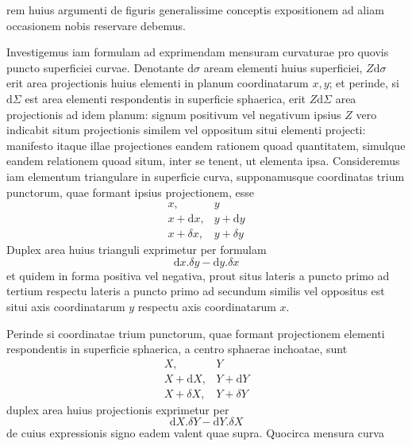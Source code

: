 %
rem huius argumenti de figuris generalissime conceptis expositionem ad aliam occasionem nobis reservare debemus.

Investigemus iam formulam ad exprimendam mensuram curvaturae pro quovis puncto superficiei curvae. Denotante \(\mathrm{d}\sigma\) aream elementi huius superficiei, \(Z\mathrm{d}\sigma\) erit area projectionis huius elementi in planum coordinatarum \(x,y\); et perinde, si \(\mathrm{d}\Sigma\) est area elementi respondentis in superficie sphaerica, erit \(Z\mathrm{d}\Sigma\) area projectionis ad idem planum: signum positivum vel negativum ipsius \(Z\) vero indicabit situm projectionis similem vel oppositum situi elementi projecti: manifesto itaque illae projectiones eandem rationem quoad quantitatem, simulque eandem relationem quoad situm, inter se tenent, ut elementa ipsa. Consideremus iam elementum triangulare in superficie curva, supponamusque coordinatas trium punctorum, quae formant ipsius projectionem, esse
\[
\begin{array}{ll}
x,&y\\
x+\mathrm{d}x,&y+\mathrm{d}y\\
x+\delta x,&y+\delta y
\end{array}
\]
Duplex area huius trianguli exprimetur per formulam
\[
\mathrm{d}x\mathord{.}\delta y-\mathrm{d}y\mathord{.}\delta x
\]
et quidem in forma positiva vel negativa, prout situs lateris a puncto primo ad tertium respectu lateris a puncto primo ad secundum similis vel oppositus est situi axis coordinatarum \(y\) respectu axis coordinatarum \(x\).

Perinde si coordinatae trium punctorum, quae formant projectionem elementi respondentis in superficie sphaerica, a centro sphaerae inchoatae, sunt
\[
\begin{array}{ll}
X,&Y\\
X+\mathrm{d}X,&Y+\mathrm{d}Y\\
X+\delta X,&Y+\delta Y
\end{array}
\]
duplex area huius projectionis exprimetur per
\[
\mathrm{d}X\mathord{.}\delta Y-\mathrm{d}Y\mathord{.}\delta X
\]
de cuius expressionis signo eadem valent quae supra. Quocirca mensura curva%
